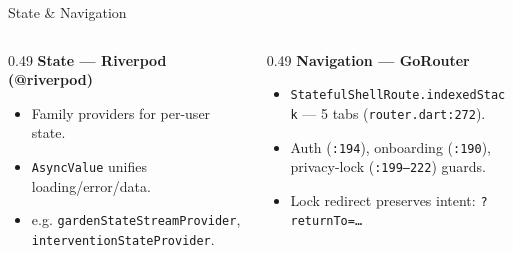 \documentclass[aspectratio=169,11pt]{beamer}
\begin{document}
\begin{frame}{State \& Navigation}
\begin{columns}[T,onlytextwidth]
  \begin{column}{0.49\textwidth}
    \textbf{\color{moodgreen}State --- Riverpod (@riverpod)}
    \begin{itemize}\footnotesize
      \item Family providers for per-user state.
      \item \texttt{AsyncValue} unifies loading/error/data.
      \item e.g. \texttt{gardenStateStreamProvider}, \texttt{interventionStateProvider}.
    \end{itemize}
  \end{column}
  \begin{column}{0.49\textwidth}
    \textbf{\color{moodgreen}Navigation --- GoRouter}
    \begin{itemize}\footnotesize
      \item \texttt{StatefulShellRoute.indexedStack} --- 5 tabs (\texttt{router.dart:272}).
      \item Auth (\texttt{:194}), onboarding (\texttt{:190}), privacy-lock (\texttt{:199--222}) guards.
      \item Lock redirect preserves intent: \texttt{?returnTo=\dots}
    \end{itemize}
  \end{column}
\end{columns}
\end{frame}
\end{document}
